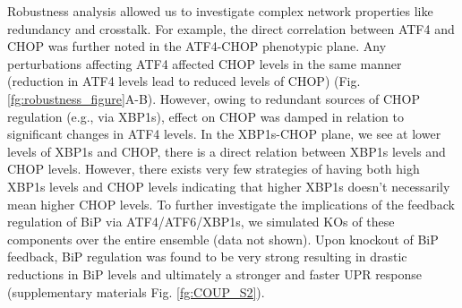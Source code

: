 \documentclass[fleqn,10pt]{wlscirep}
\begin{document}
Robustness analysis allowed us to investigate complex network properties like redundancy and crosstalk.
For example, the direct correlation between ATF4 and CHOP was further noted in the ATF4-CHOP phenotypic plane.
Any perturbations affecting ATF4 affected CHOP levels in the same manner (reduction in ATF4 levels lead to reduced levels of CHOP) (Fig. \ref{fg:robustness_figure}A-B).
However, owing to redundant sources of CHOP regulation (e.g., via XBP1s), effect on CHOP was damped in relation to significant changes in ATF4 levels.
In the XBP1s-CHOP plane, we see at lower levels of XBP1s and CHOP, there is a direct relation between XBP1s levels and CHOP levels.
However, there exists very few strategies of having both high XBP1s levels and CHOP levels indicating that higher XBP1s doesn't necessarily mean higher CHOP levels.
To further investigate the implications of the feedback regulation of BiP via ATF4/ATF6/XBP1s, we simulated KOs of these components over the entire ensemble (data not shown).
Upon knockout of BiP feedback, BiP regulation was found to be very strong resulting in drastic reductions in BiP levels and ultimately a stronger and faster UPR response (supplementary materials Fig. \ref{fg:COUP_S2}).

\iffalse (supplementary materials Fig. \ref{fg:COUP_S2}). KO of ATF6 and XBP1s mediated feedback of BiP was seen to have little effect (as marked by robustness coefficients for BiP, supplementary materials Fig. \ref{fg:COUP_S2}).
However, ATF4 mediated feedback KO led to significant amount of reduction in BiP levels (supplementary materials Fig. \ref{fg:COUP_S2}) thereby highlighting the significance of ATF4 in BiP feedback.
Upon KO of all branches of BiP feedback, we found overall reductions of BiP levels.
However, there were two distinct populations. One with a $\sim$ 10 fold reduction in BiP levels while the other had $\sim$ 1000 fold reduction in BiP levels.
These two populations could resemble two distinct operational paradigms within UPR. In the first mode of operation feedback, BiP regulation is really strong resulting in drastic reductions in BiP levels and ultimately a stronger and faster UPR response upon knockout of BiP feedback.
\fi

\end{document}
